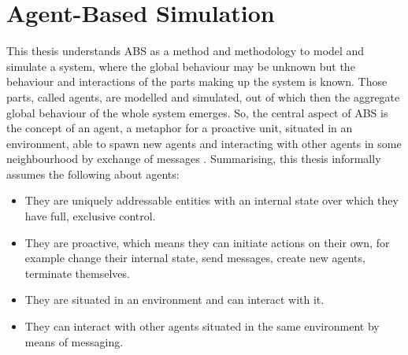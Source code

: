 \section{Agent-Based Simulation}
\label{sec:method_abs}


This thesis understands ABS as a method and methodology to model and simulate a system, where the global behaviour may be unknown but the behaviour and interactions of the parts making up the system is known. Those parts, called agents, are modelled and simulated, out of which then the aggregate global behaviour of the whole system emerges. So, the central aspect of ABS is the concept of an agent, a metaphor for a proactive unit, situated in an environment, able to spawn new agents and interacting with other agents in some neighbourhood by exchange of messages \cite{macal_everything_2016, odell_objects_2002, siebers_introduction_2008, wooldridge_introduction_2009}. Summarising, this thesis informally assumes the following about agents:

\begin{itemize}
	\item They are uniquely addressable entities with an internal state over which they have full, exclusive control.
	\item They are proactive, which means they can initiate actions on their own, for example change their internal state, send messages, create new agents, terminate themselves.
	\item They are situated in an environment and can interact with it.
	\item They can interact with other agents situated in the same environment by means of messaging.
\end{itemize} 

